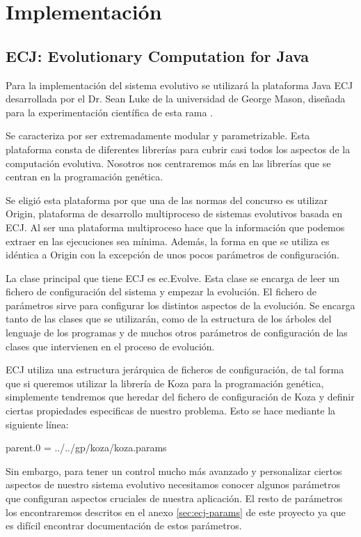 \chapter{Implementación}\label{ch:implementacion}

\section{ECJ: Evolutionary Computation for Java}\label{sec:ecj}

Para la implementación del sistema evolutivo se utilizará la plataforma Java ECJ
desarrollada por el Dr. Sean Luke de la universidad de George Mason, diseñada
para la experimentación científica de esta rama \cite{MasonECJ}.

Se caracteriza por ser extremadamente modular y parametrizable. Esta plataforma
consta de diferentes librerías para cubrir casi todos los aspectos de la
computación evolutiva. Nosotros nos centraremos más en las librerías que se
centran en la programación genética.

Se eligió esta plataforma por que una de las normas del concurso es utilizar
Origin, plataforma de desarrollo multiproceso de sistemas evolutivos basada en
ECJ. Al ser una plataforma multiproceso hace que la información que podemos
extraer en las ejecuciones sea mínima. Además, la forma en que se utiliza es
idéntica a Origin con la excepción de unos pocos parámetros de configuración.

La clase principal que tiene ECJ es ec.Evolve. Esta clase se encarga de leer un
fichero de configuración del sistema y empezar la evolución. El fichero de
parámetros sirve para configurar los distintos aspectos de la evolución. Se
encarga tanto de las clases que se utilizarán, como de la estructura de los
árboles del lenguaje de los programas y de muchos otros parámetros de
configuración de las clases que intervienen en el proceso de evolución.

ECJ utiliza una estructura jerárquica de ficheros de configuración, de tal forma
que si queremos utilizar la librería de Koza para la programación genética,
simplemente tendremos que heredar del fichero de configuración de Koza y definir
ciertas propiedades especificas de nuestro problema. Esto se hace mediante la
siguiente línea:

parent.0 = ../../gp/koza/koza.params 

Sin embargo, para tener un control mucho más avanzado y personalizar ciertos
aspectos de nuestro sistema evolutivo necesitamos conocer algunos parámetros que
configuran aspectos cruciales de nuestra aplicación. El resto de parámetros los
encontraremos descritos en el anexo \ref{sec:ecj-params} de este proyecto ya
que es difícil encontrar documentación de estos parámetros.

